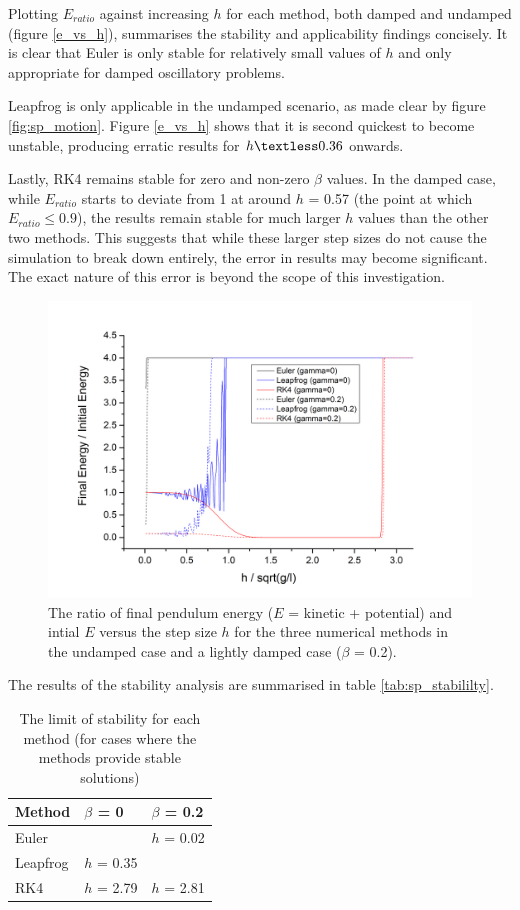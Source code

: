 \documentclass[11pt]{article}
\begin{document}
Plotting $E_{ratio}$ against increasing $h$ for each method, both damped and undamped (figure \ref{e_vs_h}), summarises the stability and applicability findings concisely. It is clear that Euler is only stable for relatively small values of $h$ and only appropriate for damped oscillatory problems.

Leapfrog is only applicable in the undamped scenario, as made clear by figure \ref{fig:sp_motion}. Figure \ref{e_vs_h} shows that it is second quickest to become unstable, producing erratic results for $h \textless 0.36$ onwards.

Lastly, RK4 remains stable for zero and non-zero $\beta$ values. In the damped case, while $E_{ratio}$ starts to deviate from 1 at around $h$ = 0.57 (the point at which $E_{ratio} \leq 0.9$), the results remain stable for much larger $h$ values than the other two methods. This suggests that while these larger step sizes do not cause the simulation to break down entirely, the error in results may become significant. The exact nature of this error is beyond the scope of this investigation.

\begin{figure}
	\includegraphics[width=1.1\textwidth]{img/energy_ratio_vs_h.png}
	\caption{The ratio of final pendulum energy ($E$ = kinetic + potential) and intial $E$ versus the step size $h$ for the three numerical methods in the undamped case and a lightly damped case ($\beta$ = 0.2).}
	\label{fig:e_vs_h}
\end{figure}

The results of the stability analysis are summarised in table \ref{tab:sp_stabililty}.

\begin{table}[ht] \label{tab:sp_stability}
	\centering
	\begin{tabular}{ l l l }
		Method & $\beta$ = 0 & $\beta$ = 0.2 \\ \hline
		Euler & \text{unstable} & $h$ = 0.02 \\
		Leapfrog & $h$ = 0.35 & \text{unstable} \\
		RK4 & $h$ = 2.79 & $h$ = 2.81
	\end{tabular}
	\caption{The limit of stability for each method (for cases where the methods provide stable solutions)} %
\end{table}
\end{document}
